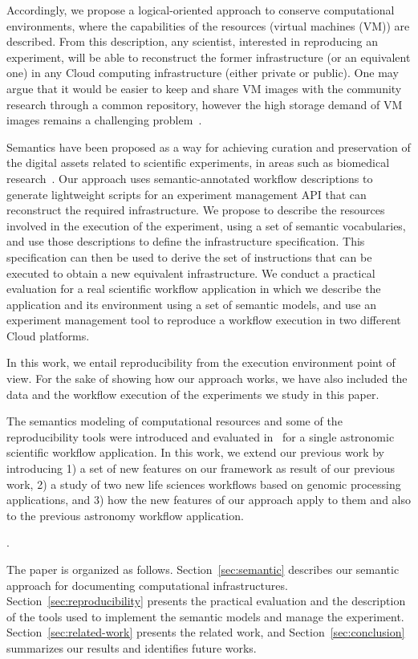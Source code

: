 Accordingly, we propose a logical-oriented approach to conserve computational environments, where the capabilities of the resources (virtual machines (VM)) are described. From this description, any scientist, interested in reproducing an experiment, will be able to reconstruct the former infrastructure (or an equivalent one) in any Cloud computing infrastructure (either private or public). One may argue that it would be easier to keep and share VM images with the community research through a common repository, however the high storage demand of VM images remains a challenging problem~\cite{Mao:2014:ROD:2600090.2512348,6552826}. 

Semantics have been proposed as a way for achieving curation and preservation of the digital assets related to scientific experiments, in areas such as biomedical research~\cite{MaloneSWO2014}. Our approach uses semantic-annotated workflow descriptions to generate lightweight scripts for an experiment management API that can reconstruct the required infrastructure. We propose to describe the resources involved in the execution of the experiment, using a set of semantic vocabularies, and use those descriptions to define the infrastructure specification. This specification can then be used to derive the set of instructions that can be executed to obtain a new equivalent infrastructure. We conduct a practical evaluation for a real scientific workflow application in which we describe the application and its environment using a set of semantic models, and use an experiment management tool to reproduce a workflow execution in two different Cloud platforms. 

In this work, we entail reproducibility from the execution environment point of view. For  the sake of showing how our approach works, we have also included the data and the workflow execution of the experiments we study in this paper.

The semantics modeling of computational resources and some of the reproducibility tools 
were introduced and evaluated in~\cite{SantanaPerez-REPPAR-2014} for a single astronomic scientific 
workflow application. In this work, we extend our previous work by introducing 1) a set of new features on our
framework as result of our previous work, 2) a study of two new life sciences workflows based on genomic processing applications,
 and 3) how the new features of our approach apply to them and also to the previous astronomy workflow application. 

 .

The paper is organized as follows. Section~\ref{sec:semantic} describes our semantic approach for documenting computational infrastructures. Section~\ref{sec:reproducibility} presents the practical evaluation and the description of the tools used to implement the semantic models and manage the experiment. Section~\ref{sec:related-work} presents the related work, and Section~\ref{sec:conclusion} summarizes our results and identifies future works.
